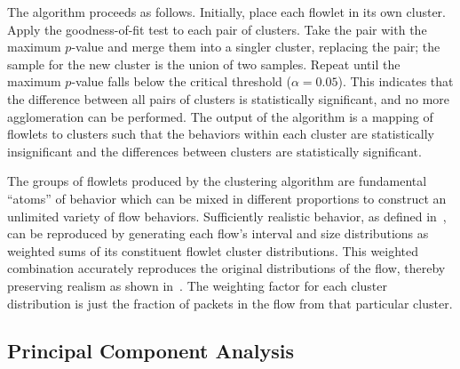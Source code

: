\documentclass[conference]{IEEEtran}
\begin{document}
The algorithm proceeds as follows. Initially, place each flowlet in its own cluster. Apply the goodness-of-fit test to each pair of clusters. Take the pair with the maximum $p$-value and merge them into a singler cluster, replacing the pair; the sample for the new cluster is the union of two samples. Repeat until the maximum $p$-value falls below the critical threshold ($\alpha=0.05$). This indicates that the difference between all pairs of clusters is statistically significant, and no more agglomeration can be performed. The output of the algorithm is a mapping of flowlets to clusters such that the behaviors within each cluster are statistically insignificant and the differences between clusters are statistically significant.

The groups of flowlets produced by the clustering algorithm are fundamental ``atoms'' of behavior which can be mixed in different proportions to construct an unlimited variety of flow behaviors. Sufficiently realistic behavior, as defined in~\cite{Karpinski07:cbr-failure}, can be reproduced by generating each flow's interval and size distributions as weighted sums of its constituent flowlet cluster distributions. This weighted combination accurately reproduces the original distributions of the flow, thereby preserving realism as shown in~\cite{Karpinski07:realism}. The weighting factor for each cluster distribution is just the fraction of packets in the flow from that particular cluster.

\subsection{Principal Component Analysis}
\label{sec:pca}


\end{document}
